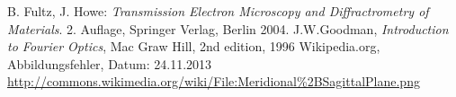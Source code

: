 \documentclass[a4paper, parskip=half, 12pt, bibliography=totocnumbered]{scrartcl}
\begin{document}





\begin{thebibliography}{10}
 B. Fultz, J. Howe: \emph{Transmission Electron Microscopy and Diffractrometry of Materials}. 2. Auflage, Springer Verlag, Berlin 2004.
 J.W.Goodman, \emph{Introduction to Fourier Optics}, Mac Graw Hill, 2nd edition, 1996
 Wikipedia.org, Abbildungsfehler, Datum: 24.11.2013\\
\url{http://commons.wikimedia.org/wiki/File:Meridional%2BSagittalPlane.png}
\end{thebibliography}
\end{document}
